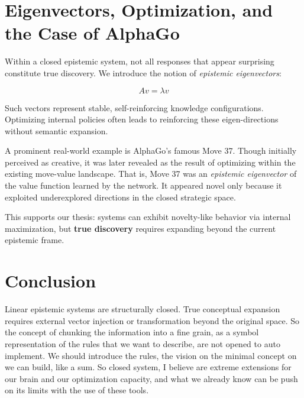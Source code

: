 \documentclass[11pt]{article}
\begin{document}
    \section{Eigenvectors, Optimization, and the Case of AlphaGo}

    Within a closed epistemic system, not all responses that appear surprising constitute true discovery. We introduce the notion of \textit{epistemic eigenvectors}:

    \[
        A v = \lambda v
    \]

    Such vectors represent stable, self-reinforcing knowledge configurations. Optimizing internal policies often leads to reinforcing these eigen-directions without semantic expansion.

    A prominent real-world example is AlphaGo's famous Move 37. Though initially perceived as creative, it was later revealed as the result of optimizing within the existing move-value landscape. That is, Move 37 was an \textit{epistemic eigenvector} of the value function learned by the network. It appeared novel only because it exploited underexplored directions in the closed strategic space.

    This supports our thesis: systems can exhibit novelty-like behavior via internal maximization, but \textbf{true discovery} requires expanding beyond the current epistemic frame.

    \section{Conclusion}

    Linear epistemic systems are structurally closed. True conceptual expansion requires external vector injection or transformation beyond the original space.
    So the concept of chunking the information into a fine grain, as a symbol representation of the rules that we want to describe, are not opened to auto implement.
    We should introduce the rules, the vision on the minimal concept on we can build, like a sum.
    So closed system, I believe are extreme extensions for our brain and our optimization capacity, and what we already know can be push on its limits with the use of these tools.
\end{document}

